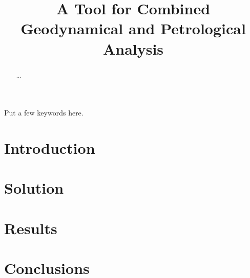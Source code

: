 \documentclass[a4paper]{article}
\title{A Tool for Combined Geodynamical and Petrological Analysis}
\date{}
\begin{document}
\maketitle

\begin{abstract}
...
\end{abstract}

\begin{keywords}
Put a few keywords here.
\end{keywords}

\section{Introduction}

\section{Solution}
\label{sec:solution}


\section{Results}
\label{sec:results}


\section{Conclusions}

\printbibliography
\end{document}
